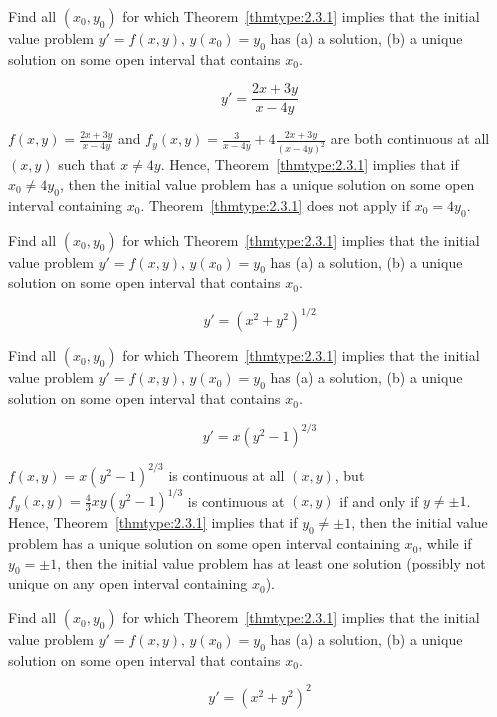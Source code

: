 \documentclass{ximera}
\begin{document}
\begin{problem}\label{exer:2.3.8} Find all $(x_0,y_0)$ for
which Theorem~\ref{thmtype:2.3.1}
implies that the initial value problem $y'=f(x,y),\,  y(x_0)=y_0$ has
(a) a solution, (b) a  unique solution on some open interval that contains $x_0$.

$$y'=\frac{2x+3y}{x-4y}$$ 



\begin{solution}
    $f(x,y)=\frac{2x+3y}{ x-4y}$ and $f_y(x,y)=\frac{3}{
x-4y}+4\frac{2x+3y}{(x-4y)^2}$ are both continuous at all $(x,y)$
such that $x\ne4y$. Hence,  Theorem~\ref{thmtype:2.3.1} implies that if
$x_0\neq 4y_0$, then the
initial value problem has a  unique solution on some open interval
containing  $x_0$.
  Theorem~\ref{thmtype:2.3.1} does not apply if $x_0=4y_0$.
\end{solution}
\end{problem}

\begin{problem}\label{exer:2.3.9} Find all $(x_0,y_0)$ for
which Theorem~\ref{thmtype:2.3.1}
implies that the initial value problem $y'=f(x,y),\,  y(x_0)=y_0$ has
(a) a solution, (b) a  unique solution on some open interval that contains $x_0$.

$$y'=(x^2+y^2)^{1/2}$$ 
\end{problem}

\begin{problem}\label{exer:2.3.10} Find all $(x_0,y_0)$ for
which Theorem~\ref{thmtype:2.3.1}
implies that the initial value problem $y'=f(x,y),\,  y(x_0)=y_0$ has
(a) a solution, (b) a  unique solution on some open interval that contains $x_0$.  

$$y'=x(y^2-1)^{2/3}$$ 



\begin{solution}
    $f(x,y)=x(y^2-1)^{2/3}$ is continuous at all $(x,y)$, but
$f_y(x,y)=\frac{4}{3}xy(y^2-1)^{1/3}$ is continuous at $(x,y)$ if
and only if $y\neq\pm1$. Hence,  Theorem~\ref{thmtype:2.3.1} implies that
if $y_0\neq\pm1$, then the
initial value problem has a  unique solution on some open interval
containing  $x_0$, while  if $y_0=\pm1$, then the initial value problem
 has at least one solution (possibly not unique on any
open interval containing  $x_0$).
\end{solution}
\end{problem}

\begin{problem}\label{exer:2.3.11} Find all $(x_0,y_0)$ for
which Theorem~\ref{thmtype:2.3.1}
implies that the initial value problem $y'=f(x,y),\,  y(x_0)=y_0$ has
(a) a solution, (b) a  unique solution on some open interval that contains $x_0$.

$$y'=(x^2+y^2)^2$$
\end{problem}
\end{document}
